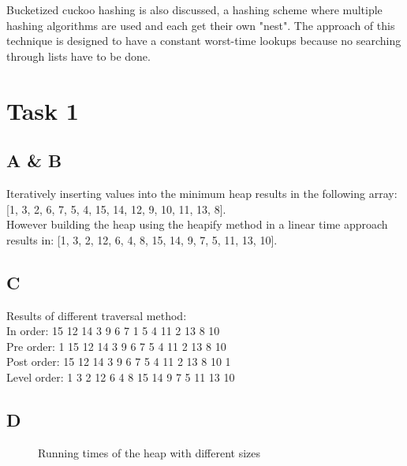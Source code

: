 \documentclass{article}
\begin{document}
Bucketized cuckoo hashing is also discussed, a hashing scheme where multiple hashing algorithms are used and each get their own "nest". The approach of this technique is designed to have a constant worst-time lookups because no searching through lists have to be done. 

\section{Task 1}

\subsection{A \& B}

Iteratively inserting values into the minimum heap results in the following array: [1, 3, 2, 6, 7, 5, 4, 15, 14, 12, 9, 10, 11, 13, 8]. \\

However building the heap using the heapify method in a linear time approach results in: [1, 3, 2, 12, 6, 4, 8, 15, 14, 9, 7, 5, 11, 13, 10]. 

\subsection{C}

Results of different traversal method: \\
In order: 15 12 14 3 9 6 7 1 5 4 11 2 13 8 10 \\
Pre order: 1 15 12 14 3 9 6 7 5 4 11 2 13 8 10 \\
Post order: 15 12 14 3 9 6 7 5 4 11 2 13 8 10 1 \\
Level order: 1 3 2 12 6 4 8 15 14 9 7 5 11 13 10 \\

\newpage
\subsection{D}

\begin{figure}[!ht]
    \centering
{}\datatable
{}
\caption{Running times of the heap with different sizes}
\label{plot:heap}
\end{figure}
\end{document}
